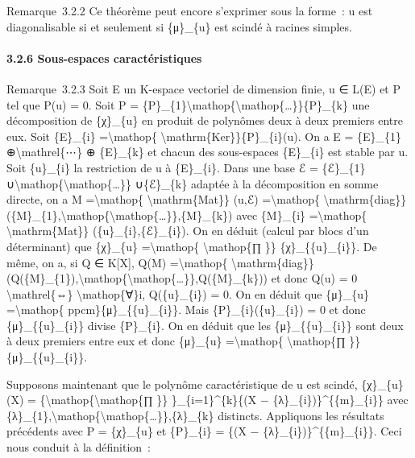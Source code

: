 \documentclass[]{article}
\begin{document}
Remarque~3.2.2 Ce théorème peut encore s'exprimer sous la forme~: u est
diagonalisable si et seulement si \{μ\}\_\{u\} est scindé à racines
simples.

\paragraph{3.2.6 Sous-espaces caractéristiques}

Remarque~3.2.3 Soit E un K-espace vectoriel de dimension finie, u ∈ L(E)
et P tel que P(u) = 0. Soit P =
\{P\}\_\{1\}\textbackslash{}mathop\{\textbackslash{}mathop\{\ldots{}\}\}\{P\}\_\{k\}
une décomposition de \{χ\}\_\{u\} en produit de polynômes deux à deux
premiers entre eux. Soit \{E\}\_\{i\} =\textbackslash{}mathop\{
\textbackslash{}mathrm\{Ker\}\}\{P\}\_\{i\}(u). On a E = \{E\}\_\{1\}
⊕\textbackslash{}mathrel\{⋯\} ⊕ \{E\}\_\{k\} et chacun des sous-espaces
\{E\}\_\{i\} est stable par u. Soit \{u\}\_\{i\} la restriction de u à
\{E\}\_\{i\}. Dans une base ℰ = \{ℰ\}\_\{1\}
∪\textbackslash{}mathop\{\textbackslash{}mathop\{\ldots{}\}\}
∪\{ℰ\}\_\{k\} adaptée à la décomposition en somme directe, on a M
=\textbackslash{}mathop\{ \textbackslash{}mathrm\{Mat\}\} (u,ℰ)
=\textbackslash{}mathop\{
\textbackslash{}mathrm\{diag\}\}(\{M\}\_\{1\},\textbackslash{}mathop\{\textbackslash{}mathop\{\ldots{}\}\},\{M\}\_\{k\})
avec \{M\}\_\{i\} =\textbackslash{}mathop\{
\textbackslash{}mathrm\{Mat\}\} (\{u\}\_\{i\},\{ℰ\}\_\{i\}). On en
déduit (calcul par blocs d'un déterminant) que \{χ\}\_\{u\}
=\textbackslash{}mathop\{ \textbackslash{}mathop\{∏ \}\}
\{χ\}\_\{\{u\}\_\{i\}\}. De même, on a, si Q ∈ K{[}X{]}, Q(M)
=\textbackslash{}mathop\{
\textbackslash{}mathrm\{diag\}\}(Q(\{M\}\_\{1\}),\textbackslash{}mathop\{\textbackslash{}mathop\{\ldots{}\}\},Q(\{M\}\_\{k\}))
et donc Q(u) = 0 \textbackslash{}mathrel\{⇔\}
\textbackslash{}mathop\{∀\}i, Q(\{u\}\_\{i\}) = 0. On en déduit que
\{μ\}\_\{u\} =\textbackslash{}mathop\{ ppcm\}\{μ\}\_\{\{u\}\_\{i\}\}.
Mais \{P\}\_\{i\}(\{u\}\_\{i\}) = 0 et donc \{μ\}\_\{\{u\}\_\{i\}\}
divise \{P\}\_\{i\}. On en déduit que les \{μ\}\_\{\{u\}\_\{i\}\} sont
deux à deux premiers entre eux et donc \{μ\}\_\{u\}
=\textbackslash{}mathop\{ \textbackslash{}mathop\{∏ \}\}
\{μ\}\_\{\{u\}\_\{i\}\}.

Supposons maintenant que le polynôme caractéristique de u est scindé,
\{χ\}\_\{u\}(X) = \{\textbackslash{}mathop\{\textbackslash{}mathop\{∏
\}\} \}\_\{i=1\}\^{}\{k\}\{(X − \{λ\}\_\{i\})\}\^{}\{\{m\}\_\{i\}\} avec
\{λ\}\_\{1\},\textbackslash{}mathop\{\textbackslash{}mathop\{\ldots{}\}\},\{λ\}\_\{k\}
distincts. Appliquons les résultats précédents avec P = \{χ\}\_\{u\} et
\{P\}\_\{i\} = \{(X − \{λ\}\_\{i\})\}\^{}\{\{m\}\_\{i\}\}. Ceci nous
conduit à la définition~:
\end{document}
